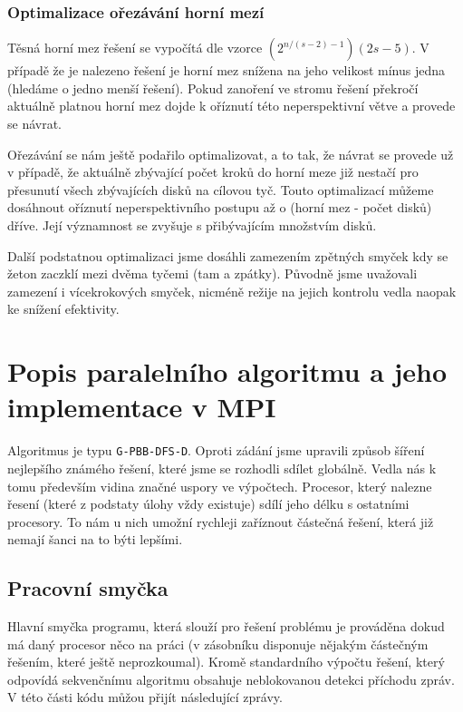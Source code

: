 \documentclass[12pt]{article}
\begin{document}
\subsubsection{Optimalizace ořezávání horní mezí}
Těsná horní mez řešení se vypočítá dle vzorce $(2^{n/(s-2)-1})(2s-5)$. V případě
že je nalezeno řešení je horní mez snížena na jeho velikost mínus jedna (hledáme
o jedno menší řešení). Pokud zanoření ve stromu řešení překročí aktuálně platnou
horní mez dojde k oříznutí této neperspektivní větve a provede se návrat. 

Ořezávání se nám ještě podařilo optimalizovat, a to tak, že návrat se provede už
v případě, že aktuálně zbývající počet kroků do horní meze již nestačí pro
přesunutí všech zbývajících disků na cílovou tyč. Touto optimalizací můžeme
dosáhnout oříznutí neperspektivního postupu až o (horní mez - počet disků)
dříve. Její významnost se zvyšuje s přibývajícím množstvím disků.

Další podstatnou optimalizaci jsme dosáhli zamezením zpětných smyček kdy se
žeton zaczklí mezi dvěma tyčemi (tam a zpátky). Původně jsme uvažovali zamezení
i vícekrokových smyček, nicméně režije na jejich kontrolu vedla naopak ke
snížení efektivity.

\section{Popis paralelního algoritmu a jeho implementace v MPI}
Algoritmus je typu \verb|G-PBB-DFS-D|. Oproti zádání jsme upravili způsob
šíření nejlepšího známého řešení, které jsme se rozhodli sdílet globálně. Vedla
nás k tomu především vidina značné uspory ve výpočtech. Procesor, který nalezne
řesení (které z podstaty úlohy vždy existuje) sdílí jeho délku s ostatními
procesory. To nám u nich umožní rychleji zaříznout částečná řešení, která již
nemají šanci na to býti lepšími.

\subsection{Pracovní smyčka}
Hlavní smyčka programu, která slouží pro řešení problému je prováděna dokud má
daný procesor něco na práci (v zásobníku disponuje nějakým částečným řešením,
které ještě neprozkoumal). Kromě standardního výpočtu řešení, který odpovídá
sekvenčnímu algoritmu obsahuje neblokovanou detekci příchodu zpráv. V této
části kódu můžou přijít následující zprávy.
\end{document}
